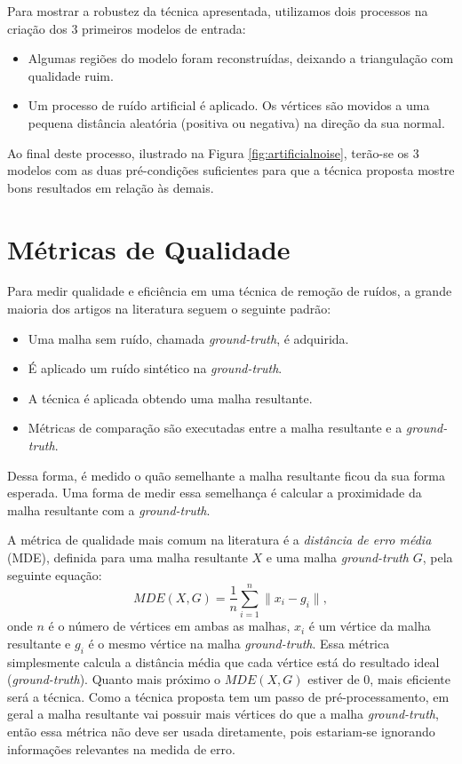 Para mostrar a robustez da técnica apresentada, utilizamos dois processos na criação dos 3 primeiros modelos de entrada:
\begin{itemize}
    \item Algumas regiões do modelo foram reconstruídas, deixando a triangulação com qualidade ruim.
    \item Um processo de ruído artificial é aplicado. Os vértices são movidos a uma pequena distância aleatória (positiva ou negativa) na direção da sua normal.
\end{itemize}

Ao final deste processo, ilustrado na Figura \ref{fig:artificialnoise}, terão-se os 3 modelos com as duas pré-condições suficientes para que a técnica proposta mostre bons resultados em relação às demais. 

\section{Métricas de Qualidade}\label{metrics}

Para medir qualidade e eficiência em uma técnica de remoção de ruídos, a grande maioria dos artigos na literatura seguem o seguinte padrão:
\begin{itemize}
    \item Uma malha sem ruído, chamada \textit{ground-truth}, é adquirida.
    \item É aplicado um ruído sintético na \textit{ground-truth}.
    \item A técnica é aplicada obtendo uma malha resultante.
    \item Métricas de comparação são executadas entre a malha resultante e a \textit{ground-truth}.
\end{itemize}

Dessa forma, é medido o quão semelhante a malha resultante ficou da sua forma esperada. Uma forma de medir essa semelhança é calcular a proximidade da malha resultante com a \textit{ground-truth}.

A métrica de qualidade mais comum na literatura é a \textit{distância de erro média} (MDE), definida para uma malha resultante $X$ e uma malha \textit{ground-truth} $G$, pela seguinte equação:
\begin{equation}
    MDE(X,G) = \frac{1}{n} \sum_{i=1}^{n}{\|x_i - g_i \|}, 
\end{equation}
onde $n$ é o número de vértices em ambas as malhas, $x_i$ é um vértice da malha resultante e $g_i$ é o mesmo vértice na malha \textit{ground-truth}. Essa métrica simplesmente calcula a distância média que cada vértice está do resultado ideal (\textit{ground-truth}). Quanto mais próximo o $MDE(X,G)$ estiver de $0$, mais eficiente será a técnica. Como a técnica proposta tem um passo de pré-processamento, em geral a malha resultante vai possuir mais vértices do que a malha \textit{ground-truth}, então essa métrica não deve ser usada diretamente, pois estariam-se ignorando informações relevantes na medida de erro.

